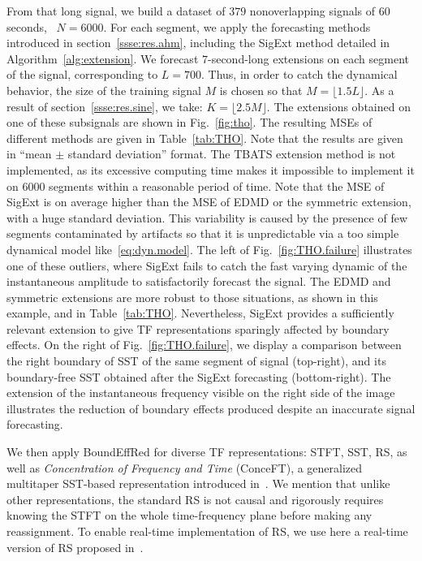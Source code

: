 From that long signal, we build a dataset of $379$ non\-overlapping signals of 60 seconds, \ie~$N=6000$. For each segment, we apply the forecasting methods introduced in section~\ref{ssse:res.ahm}, including the {\sf SigExt} method detailed in Algorithm~\ref{alg:extension}. We forecast $7$-second-long extensions on each segment of the signal, corresponding to $L =700$. Thus, in order to catch the dynamical behavior, the size of the training signal $M$ is chosen so that $M=\lfloor 1.5L\rfloor$. As a result of section~\ref{ssse:res.sine}, we take: $K=\lfloor2.5M\rfloor$. The extensions obtained on one of these subsignals are shown in Fig.~\ref{fig:tho}. The resulting MSEs of different methods are given in Table~\ref{tab:THO}. Note that the results are given in ``mean $\pm$ standard deviation'' format. The TBATS extension method is not implemented, as its excessive computing time makes it impossible to implement it on $6000$ segments within a reasonable period of time.
%
Note that the MSE of {\sf SigExt} is on average higher than the MSE of EDMD or the symmetric extension, with a huge standard deviation. This variability is caused by the presence of few segments contaminated by artifacts so that it is unpredictable via a too simple dynamical model like~\eqref{eq:dyn.model}. The left of Fig.~\ref{fig:THO.failure} illustrates one of these outliers, where {\sf SigExt} fails to catch the fast varying dynamic of the instantaneous amplitude to satisfactorily forecast the signal. The EDMD and symmetric extensions are more robust to those situations, as shown in this example, and in Table~\ref{tab:THO}. Nevertheless, {\sf SigExt} provides a sufficiently relevant extension to give TF representations sparingly affected by boundary effects. On the right of Fig.~\ref{fig:THO.failure}, we display a comparison between the right boundary of SST of the same segment of signal (top-right), and its boundary-free SST obtained after the {\sf SigExt} forecasting (bottom-right). The extension of the instantaneous frequency visible on the right side of the image illustrates the reduction of boundary effects produced despite an inaccurate signal forecasting.

We then apply {\sf BoundEffRed} for diverse TF representations: STFT, SST, RS, as well as \textit{Concentration of Frequency and Time} (ConceFT), a generalized multitaper SST-based representation introduced in~\cite{Daubechies16conceft}.  We mention that unlike other representations, the standard RS is not causal and rigorously requires knowing the STFT on the whole time-frequency plane before making any reassignment. To enable real-time implementation of RS, we use here a real-time version of RS proposed in~\cite{Lin17conceft}.

